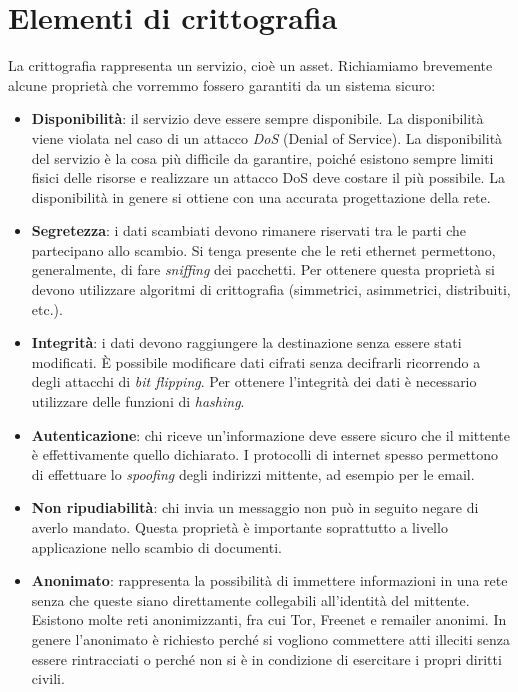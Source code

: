\chapter{Elementi di crittografia}
La crittografia rappresenta un servizio, cioè un asset. Richiamiamo brevemente alcune proprietà che vorremmo fossero garantiti da un sistema sicuro:
\begin{itemize}
	\item \textbf{Disponibilità}: il servizio deve essere sempre disponibile. La disponibilità viene violata nel caso di un attacco \textit{DoS} (Denial of Service). La disponibilità del servizio è la cosa più difficile da garantire, poiché esistono sempre limiti fisici delle risorse e realizzare un attacco DoS deve costare il più possibile. La disponibilità in genere si ottiene con una accurata progettazione della rete.
	\item \textbf{Segretezza}: i dati scambiati devono rimanere riservati tra le parti che partecipano allo scambio. Si tenga presente che le reti ethernet permettono, generalmente, di fare \textit{sniffing} dei pacchetti. Per ottenere questa proprietà si devono utilizzare algoritmi di crittografia (simmetrici, asimmetrici, distribuiti, etc.).
	\item \textbf{Integrità}: i dati devono raggiungere la destinazione senza essere stati modificati. È possibile modificare dati cifrati senza decifrarli ricorrendo a degli attacchi di \textit{bit flipping}. Per ottenere l'integrità dei dati è necessario utilizzare delle funzioni di \textit{hashing}.
	\item \textbf{Autenticazione}: chi riceve un'informazione deve essere sicuro che il mittente è effettivamente quello dichiarato. I protocolli di internet spesso permettono di effettuare lo \textit{spoofing} degli	indirizzi mittente, ad esempio per le email.
	\item \textbf{Non ripudiabilità}: chi invia un messaggio non può in seguito negare di averlo mandato. Questa proprietà è importante soprattutto a livello applicazione nello scambio di documenti.
	\item \textbf{Anonimato}: rappresenta la possibilità di immettere informazioni in una rete senza che queste siano direttamente collegabili all'identità del mittente. Esistono molte reti anonimizzanti, fra cui Tor, Freenet e remailer anonimi. In genere l'anonimato è richiesto perché si vogliono commettere atti illeciti senza essere rintracciati o perché non si è in condizione di esercitare i propri diritti civili.
\end{itemize}


